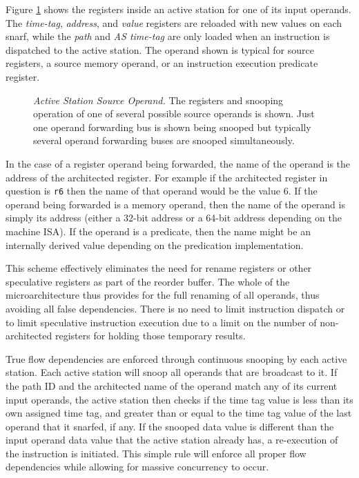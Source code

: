\documentclass[10pt,dvips]{article}
\begin{document}
Figure \ref{fig:source} shows the registers inside an active
station for one of its input operands.  The 
{\em time-tag},
{\em address}, and
{\em value} registers are reloaded with new values on each snarf,
while the
{\em path} and
{\em AS time-tag} are only loaded when an instruction is
dispatched to the active station.
The operand shown is typical for source registers, a source memory
operand, or an instruction execution predicate register.
%
\begin{figure}
\centering
{}
\caption{{\em Active Station Source Operand.} The registers and snooping
operation of one of several possible source operands is shown.
Just one operand forwarding bus is shown being snooped but
typically several operand forwarding buses are snooped simultaneously.}
\label{fig:source}
\end{figure}
%
In the case of a register operand being forwarded, the name of the
operand is the address of the architected register.  For example
if the architected register in question is {\tt r6} then the
name of that operand would be the value 6.  If the operand
being forwarded is a memory operand, then the name of the operand
is simply its address (either a 32-bit address or a 64-bit address
depending on the machine ISA).  If the operand is a predicate,
then the name might be an internally derived value depending on
the predication implementation. 

This scheme effectively eliminates the need for rename registers
or other speculative registers as part of the reorder buffer.
The whole of the microarchitecture thus provides for the full renaming
of all operands, thus avoiding all false dependencies.
There is no need to limit instruction dispatch or to limit speculative
instruction execution due to a limit on the number of non-architected
registers for holding those temporary results.

True flow dependencies are enforced through continuous  
snooping by each active station.  Each active station
will snoop all operands that are broadcast to it.  If the
path ID and the architected name of the operand match any of
its current input operands, the active station then checks
if the time tag value is less than its own assigned time tag,
and greater than or equal to the time tag value of the last
operand that it snarfed, if any.  If the snooped data value is
different than the input operand data value that the active
station already has, a re-execution of the instruction is initiated.
This simple rule will enforce
all proper flow dependencies while allowing for massive
concurrency to occur.
%
%
\end{document}
